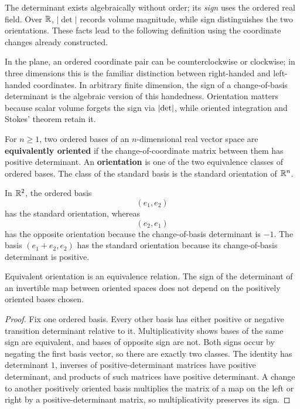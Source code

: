 The determinant exists algebraically without order; its \emph{sign} uses
the ordered real field. Over $\mathbb{R}$, $|\det|$ records volume magnitude,
while sign distinguishes the two orientations. These facts lead to the
following definition using the coordinate changes already constructed.


In the plane, an ordered coordinate pair can be counterclockwise or
clockwise; in three dimensions this is the familiar distinction between
right-handed and left-handed coordinates.  In arbitrary finite dimension,
the sign of a change-of-basis determinant is the algebraic version of this
handedness.  Orientation matters because scalar volume forgets the sign via
$\lvert \det\rvert$, while oriented integration and Stokes' theorem retain it.

\begin{definition}[Orientation]\label{def:orientation}
For $n\geq1$, two ordered bases of an $n$-dimensional real vector space are
\textbf{equivalently oriented} if the change-of-coordinate matrix between
them has positive determinant.  An \textbf{orientation} is one of the two
equivalence classes of ordered bases.  The class of the standard basis is the
standard orientation of $\mathbb{R}^n$.
\end{definition}

In \(\mathbb{R}^2\), the ordered basis
\[
(e_1,e_2)
\]
has the standard orientation, whereas
\[
(e_2,e_1)
\]
has the opposite orientation because the change-of-basis determinant is
\(-1\). The basis \((e_1+e_2,e_2)\) has the standard orientation because
its change-of-basis determinant is positive.

\begin{proposition}[Orientation]
\label{prop:orientation-well-defined}
Equivalent orientation is an equivalence relation.  The sign of the
determinant of an invertible map between oriented spaces does not depend on
the positively oriented bases chosen.
\end{proposition}
\begin{proof}
Fix one ordered basis. Every other basis has either positive or negative
transition determinant relative to it. Multiplicativity shows bases of the
same sign are equivalent, and bases of opposite sign are not. Both signs
occur by negating the first basis vector, so there are exactly two classes.
The identity has determinant $1$, inverses of positive-determinant matrices
have positive determinant, and products of such matrices have positive
determinant.  A change to another positively oriented basis multiplies the
matrix of a map on the left or right by a positive-determinant matrix, so
multiplicativity preserves its sign.
\end{proof}





